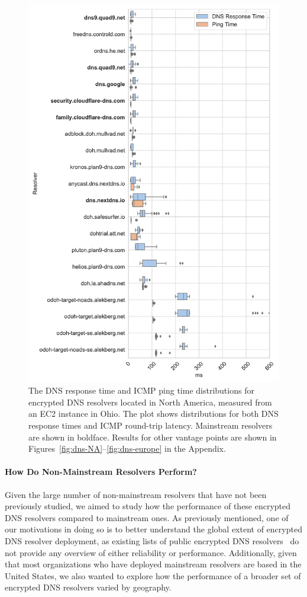 \begin{figure}[t!]
\centering\includegraphics[width=0.8\columnwidth]{figures/ohio_NA.pdf}
\caption{The DNS response time and ICMP ping time distributions for
    encrypted DNS resolvers located in North America, measured from an EC2
    instance in Ohio.  The plot shows distributions for both DNS response times
    and ICMP round-trip latency. Mainstream resolvers are shown in boldface.
    Results for other vantage points are shown in Figures~\ref{fig:dns-NA}--\ref{fig:dns-europe} in the Appendix.}
    \label{fig:dns-us-ohio}
\end{figure}


\paragraph{How Do Non-Mainstream Resolvers Perform?}
Given the large number of non-mainstream resolvers that have not been
previously studied, we aimed to study how
the performance of these encrypted DNS resolvers compared to mainstream ones.
As previously mentioned, one of our motivations in doing so is to better
understand the global extent of encrypted DNS resolver deployment, as existing
lists of public encrypted DNS resolvers~\cite{dnscrypt-public-resolvers} do
not provide any overview of either reliability or performance. Additionally,
given that most organizations who have deployed mainstream resolvers are based
in the United States, we also wanted to explore how the performance of a
broader set of encrypted DNS resolvers varied by geography.

